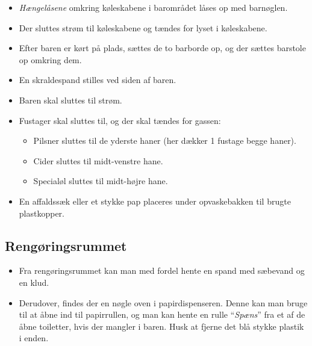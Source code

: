 \begin{itemize}
    \item \textit{Hængelåsene} omkring køleskabene i barområdet låses op med barnøglen.
	\item Der sluttes strøm til køleskabene og tændes for lyset i køleskabene.
	\item Efter baren er kørt på plads, sættes de to barborde op, og der sættes barstole op omkring dem.
	\item En skraldespand stilles ved siden af baren.
	\item Baren skal sluttes til strøm.
	\item Fustager skal sluttes til, og der skal tændes for gassen:
	\begin{itemize}
		\item Pilsner sluttes til de yderste haner (her dækker 1 fustage begge haner).
		\item Cider sluttes til midt-venstre hane.
		\item Specialøl sluttes til midt-højre hane.
	\end{itemize}
	\item En affaldssæk eller et stykke pap placeres under opvaskebakken til brugte plastkopper.
\end{itemize}

\subsection{Rengøringsrummet}
\label{sec:pre:rengøring}
\begin{itemize}
	\item Fra rengøringsrummet kan man med fordel hente en spand med sæbevand og en klud.
	\item Derudover, findes der en nøgle oven i papirdispenseren. Denne kan man bruge til
	at åbne ind til papirrullen, og man kan hente en rulle ``\textit{Spæns}''
	fra et af de åbne toiletter, hvis der mangler i baren. 
	Husk at fjerne det blå stykke plastik i enden.
\end{itemize}
